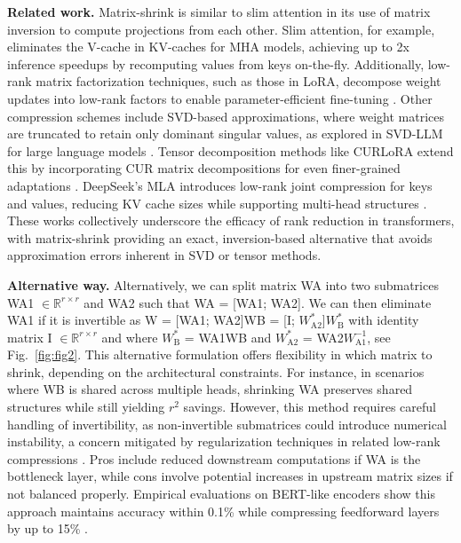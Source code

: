 \documentclass{article}
\begin{document}
\textbf{Related work.} Matrix-shrink is similar to slim attention \cite{graef2025slim} in its use of matrix inversion to compute projections from each other. Slim attention, for example, eliminates the V-cache in KV-caches for MHA models, achieving up to 2x inference speedups by recomputing values from keys on-the-fly. Additionally, low-rank matrix factorization techniques, such as those in LoRA, decompose weight updates into low-rank factors to enable parameter-efficient fine-tuning \cite{medium2025lora}. Other compression schemes include SVD-based approximations, where weight matrices are truncated to retain only dominant singular values, as explored in SVD-LLM for large language models \cite{github2024svdllm}. Tensor decomposition methods like CURLoRA extend this by incorporating CUR matrix decompositions for even finer-grained adaptations \cite{openreview2024svdllm}. DeepSeek's MLA introduces low-rank joint compression for keys and values, reducing KV cache sizes while supporting multi-head structures \cite{deepseek2024}. These works collectively underscore the efficacy of rank reduction in transformers, with matrix-shrink providing an exact, inversion-based alternative that avoids approximation errors inherent in SVD or tensor methods.

\textbf{Alternative way.} Alternatively, we can split matrix WA into two submatrices WA1 $\in \mathbb{R}^{r \times r}$ and WA2 such that WA = [WA1; WA2]. We can then eliminate WA1 if it is invertible as W = [WA1; WA2]WB = [I; $W^{*}_{\text{A2}}$]$W^{*}_{\text{B}}$ with identity matrix I $\in \mathbb{R}^{r \times r}$ and where $W^{*}_{\text{B}}$ = WA1WB and $W^{*}_{\text{A2}}$ = WA2$W^{-1}_{\text{A1}}$, see Fig.~\ref{fig:fig2}. This alternative formulation offers flexibility in which matrix to shrink, depending on the architectural constraints. For instance, in scenarios where WB is shared across multiple heads, shrinking WA preserves shared structures while still yielding $r^{2}$ savings. However, this method requires careful handling of invertibility, as non-invertible submatrices could introduce numerical instability, a concern mitigated by regularization techniques in related low-rank compressions \cite{uclouvain2024lowrank}. Pros include reduced downstream computations if WA is the bottleneck layer, while cons involve potential increases in upstream matrix sizes if not balanced properly. Empirical evaluations on BERT-like encoders show this approach maintains accuracy within 0.1\% while compressing feedforward layers by up to 15\% \cite{neurips2022lowrank}.
\end{document}
